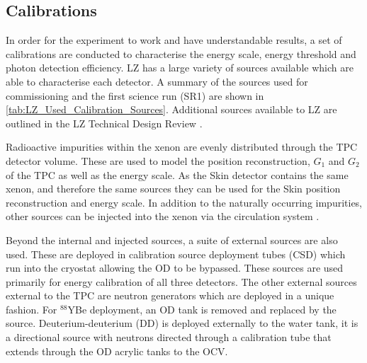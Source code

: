 \subsection{Calibrations}
\label{sec:lz_calibrations}
\par
In order for the experiment to work and have understandable results, a set of calibrations are conducted to characterise the energy scale, energy threshold and photon detection efficiency.
LZ has a large variety of sources available which are able to characterise each detector.
A summary of the sources used for commissioning and the first science run (SR1) are shown in \autoref{tab:LZ_Used_Calibration_Sources}.
Additional sources available to LZ are outlined in the LZ Technical Design Review \cite{LZ_TechnicalDesignReview_ref}.
\par
Radioactive impurities within the xenon are evenly distributed through the TPC detector volume.
These are used to model the position reconstruction, $G_1$ and $G_2$ of the TPC as well as the energy scale.
As the Skin detector contains the same xenon, and therefore the same sources they can be used for the Skin position reconstruction and energy scale.
In addition to the naturally occurring impurities, other sources can be injected into the xenon via the circulation system \cite{christophernedlik_thesis_ref}.
\par
Beyond the internal and injected sources, a suite of external sources are also used.
These are deployed in calibration source deployment tubes (CSD) which run into the cryostat allowing the OD to be bypassed.
These sources are used primarily for energy calibration of all three detectors.
The other external sources external to the TPC are neutron generators which are deployed in a unique fashion.
For $^{88}$YBe deployment, an OD tank is removed and replaced by the source.
Deuterium-deuterium (DD) is deployed externally to the water tank, it is a directional source with neutrons directed through a calibration tube that extends through the OD acrylic tanks to the OCV.

